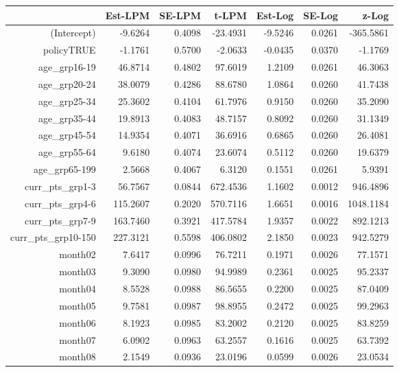 \documentclass[11pt]{article}
\begin{document}
\begin{table}[ht]
\centering
\begin{tabular}{rrrrrrr}
  \hline
 & Est-LPM & SE-LPM & t-LPM & Est-Log & SE-Log & z-Log \\ 
  \hline
(Intercept) & -9.6264 & 0.4098 & -23.4931 & -9.5246 & 0.0261 & -365.5861 \\ 
  policyTRUE & -1.1761 & 0.5700 & -2.0633 & -0.0435 & 0.0370 & -1.1769 \\ 
  age\_grp16-19 & 46.8714 & 0.4802 & 97.6019 & 1.2109 & 0.0261 & 46.3063 \\ 
  age\_grp20-24 & 38.0079 & 0.4286 & 88.6780 & 1.0864 & 0.0260 & 41.7438 \\ 
  age\_grp25-34 & 25.3602 & 0.4104 & 61.7976 & 0.9150 & 0.0260 & 35.2090 \\ 
  age\_grp35-44 & 19.8913 & 0.4083 & 48.7157 & 0.8092 & 0.0260 & 31.1349 \\ 
  age\_grp45-54 & 14.9354 & 0.4071 & 36.6916 & 0.6865 & 0.0260 & 26.4081 \\ 
  age\_grp55-64 & 9.6180 & 0.4074 & 23.6074 & 0.5112 & 0.0260 & 19.6379 \\ 
  age\_grp65-199 & 2.5668 & 0.4067 & 6.3120 & 0.1551 & 0.0261 & 5.9391 \\ 
  curr\_pts\_grp1-3 & 56.7567 & 0.0844 & 672.4536 & 1.1602 & 0.0012 & 946.4896 \\ 
  curr\_pts\_grp4-6 & 115.2607 & 0.2020 & 570.7116 & 1.6651 & 0.0016 & 1048.1184 \\ 
  curr\_pts\_grp7-9 & 163.7460 & 0.3921 & 417.5784 & 1.9357 & 0.0022 & 892.1213 \\ 
  curr\_pts\_grp10-150 & 227.3121 & 0.5598 & 406.0802 & 2.1850 & 0.0023 & 942.5279 \\ 
  month02 & 7.6417 & 0.0996 & 76.7211 & 0.1971 & 0.0026 & 77.1571 \\ 
  month03 & 9.3090 & 0.0980 & 94.9989 & 0.2361 & 0.0025 & 95.2337 \\ 
  month04 & 8.5528 & 0.0988 & 86.5655 & 0.2200 & 0.0025 & 87.0409 \\ 
  month05 & 9.7581 & 0.0987 & 98.8955 & 0.2472 & 0.0025 & 99.2963 \\ 
  month06 & 8.1923 & 0.0985 & 83.2002 & 0.2120 & 0.0025 & 83.8259 \\ 
  month07 & 6.0902 & 0.0963 & 63.2557 & 0.1616 & 0.0025 & 63.7392 \\ 
  month08 & 2.1549 & 0.0936 & 23.0196 & 0.0599 & 0.0026 & 23.0534 \\ 

\end{tabular}
\end{table}
\end{document}
